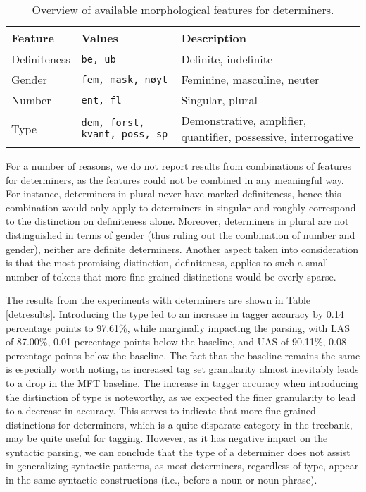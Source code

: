 \documentclass[a4paper,12pt,english]{book}
\begin{document}
\begin{table}
    \centering
    \smaller[0.5]
    \begin{tabular}{@{}lp{5cm}p{5cm}@{}}
        \toprule
        \textbf{Feature} & \textbf{Values} & \textbf{Description}\\
        \midrule
        Definiteness & \texttt{be, ub} & Definite, indefinite \\
        Gender & \texttt{fem, mask, nøyt} & Feminine, masculine, neuter \\
        Number & \texttt{ent, fl} & Singular, plural \\
        Type & \texttt{dem, forst, kvant, poss, sp} & Demonstrative, amplifier,
        quantifier, possessive, interrogative \\
        \bottomrule
    \end{tabular}
    \caption{Overview of available morphological features for determiners.}
    \label{detfeatures}
\end{table}

For a number of reasons, we do not report results from combinations of features
for determiners, as the features could not be combined in any meaningful way.
For instance, determiners in plural never have marked definiteness, hence this
combination would only apply to determiners in singular and roughly correspond
to the distinction on definiteness alone. Moreover, determiners in plural are
not distinguished in terms of gender (thus ruling out the combination of number
and gender), neither are definite determiners. Another aspect taken into
consideration is that the most promising distinction, definiteness, applies to
such a small number of tokens that more fine-grained distinctions would be
overly sparse.


The results from the experiments with determiners are shown in Table
\ref{detresults}.  Introducing the type led to an increase in tagger accuracy
by 0.14 percentage points to 97.61\%, while marginally impacting the parsing,
with LAS of 87.00\%, 0.01 percentage points below the baseline, and UAS of
90.11\%, 0.08 percentage points below the baseline. The fact that the baseline
remains the same is especially worth noting, as increased tag set granularity
almost inevitably leads to a drop in the MFT baseline. The increase in tagger
accuracy when introducing the distinction of type is noteworthy, as we expected
the finer granularity to lead to a decrease in accuracy. This serves to
indicate that more fine-grained distinctions for determiners, which is a quite
disparate category in the treebank, may be quite useful for tagging. However,
as it has negative impact on the syntactic parsing, we can conclude that the
type of a determiner does not assist in generalizing syntactic patterns, as
most determiners, regardless of type, appear in the same syntactic
constructions (i.e., before a noun or noun phrase).
\end{document}

